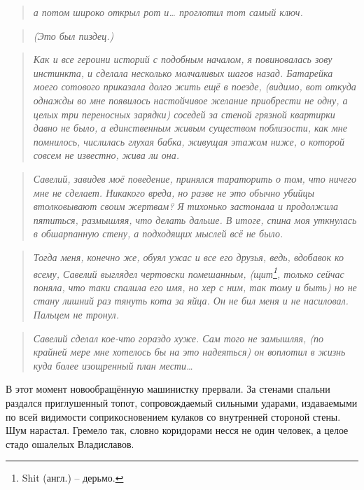 \documentclass[
  a5paperpaper,
  DIV=11,
  numbers=noendperiod]{scrreprt}
\begin{document}
\begin{quote}
\emph{а потом широко открыл рот и\ldots{} проглотил тот самый ключ.}
\end{quote}

\begin{quote}
\emph{(Это был пиздец.)}
\end{quote}

\begin{quote}
\emph{Как и все героини историй с подобным началом, я повиновалась зову
инстинкта, и сделала несколько молчаливых шагов назад. Батарейка моего
сотового приказала долго жить ещё в поезде, (видимо, вот откуда однажды
во мне появилось настойчивое желание приобрести не одну, а целых три
переносных зарядки) соседей за стеной грязной квартирки давно не было, а
единственным живым существом поблизости, как мне помнилось, числилась
глухая бабка, живущая этажом ниже, о которой совсем не известно, жива ли
она. }
\end{quote}

\begin{quote}
\emph{Савелий, завидев моё поведение, принялся тараторить о том, что
ничего мне не сделает. Никакого вреда, но разве не это обычно убийцы
втолковывают своим жертвам? Я тихонько застонала и продолжила пятиться,
размышляя, что делать дальше. В итоге, спина моя уткнулась в обшарпанную
стену, а подходящих мыслей всё не было.}
\end{quote}

\begin{quote}
\emph{Тогда меня, конечно же, обуял ужас и все его друзья, ведь,
вдобавок ко всему, Савелий выглядел чертовски помешанным,
(щит\footnote{Shit (англ.) -- дерьмо.}, только сейчас поняла, что таки
спалила его имя, но хер с ним, так тому и быть) но не стану лишний раз
тянуть кота за яйца. Он не бил меня и не насиловал. Пальцем не тронул.}
\end{quote}

\begin{quote}
\emph{Савелий сделал кое-что гораздо хуже. Сам того не замышляя, (по
крайней мере мне хотелось бы на это надеяться) он воплотил в жизнь куда
более изощренный план мести\ldots{}}
\end{quote}

В этот момент новообращённую машинистку прервали. За стенами спальни
раздался приглушенный топот, сопровождаемый сильными ударами,
издаваемыми по всей видимости соприкосновением кулаков со внутренней
стороной стены. Шум нарастал. Гремело так, словно коридорами несся не
один человек, а целое стадо ошалелых Владиславов.
\end{document}
